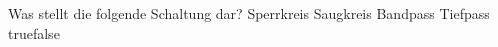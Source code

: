     {Was stellt die folgende Schaltung dar? }
    {Sperrkreis}
    {Saugkreis}
    {Bandpass}
    {Tiefpass}
    {true}{false}